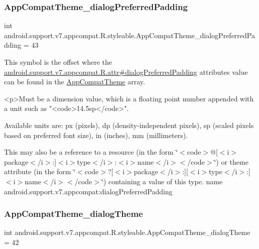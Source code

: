 \subsubsection{\texorpdfstring{App\+Compat\+Theme\+\_\+dialog\+Preferred\+Padding}{AppCompatTheme\_dialogPreferredPadding}}
{\footnotesize\ttfamily int android.\+support.\+v7.\+appcompat.\+R.\+styleable.\+App\+Compat\+Theme\+\_\+dialog\+Preferred\+Padding = 43\hspace{0.3cm}{\ttfamily [static]}}

This symbol is the offset where the \hyperlink{classandroid_1_1support_1_1v7_1_1appcompat_1_1R_1_1attr_a8d8cccb8f3afab5313a1361426709f21}{android.\+support.\+v7.\+appcompat.\+R.\+attr\#dialog\+Preferred\+Padding} attribute\textquotesingle{}s value can be found in the \hyperlink{classandroid_1_1support_1_1v7_1_1appcompat_1_1R_1_1styleable_a5c42f89e8a410c323be34208d75c430b}{App\+Compat\+Theme} array.

\begin{DoxyVerb}      <p>Must be a dimension value, which is a floating point number appended with a unit such as "<code>14.5sp</code>".
\end{DoxyVerb}
 Available units are\+: px (pixels), dp (density-\/independent pixels), sp (scaled pixels based on preferred font size), in (inches), mm (millimeters). 

This may also be a reference to a resource (in the form \char`\"{}$<$code$>$@\mbox{[}$<$i$>$package$<$/i$>$\+:\mbox{]}$<$i$>$type$<$/i$>$\+:$<$i$>$name$<$/i$>$$<$/code$>$\char`\"{}) or theme attribute (in the form \char`\"{}$<$code$>$?\mbox{[}$<$i$>$package$<$/i$>$\+:\mbox{]}\mbox{[}$<$i$>$type$<$/i$>$\+:\mbox{]}$<$i$>$name$<$/i$>$$<$/code$>$\char`\"{}) containing a value of this type.  name android.\+support.\+v7.\+appcompat\+:dialog\+Preferred\+Padding \mbox{\label{classandroid_1_1support_1_1v7_1_1appcompat_1_1R_1_1styleable_a3b373a5641c2c0d185832eeac15143ef}} 
\subsubsection{\texorpdfstring{App\+Compat\+Theme\+\_\+dialog\+Theme}{AppCompatTheme\_dialogTheme}}
{\footnotesize\ttfamily int android.\+support.\+v7.\+appcompat.\+R.\+styleable.\+App\+Compat\+Theme\+\_\+dialog\+Theme = 42\hspace{0.3cm}{\ttfamily [static]}}

